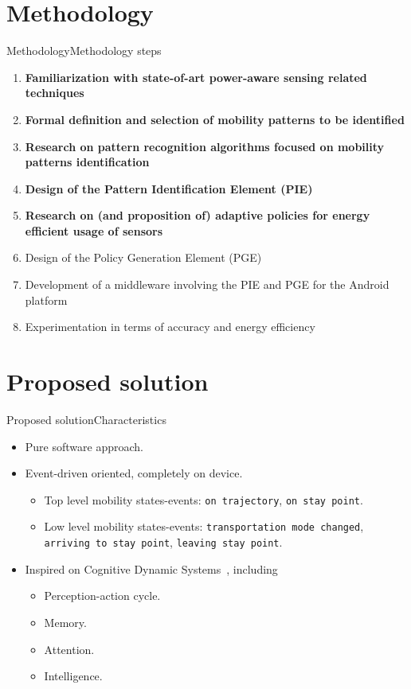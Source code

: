 \documentclass[10pt,xcolor={dvipsnames}]{beamer}
\begin{document}
\section{Methodology}
\begin{frame}{Methodology}{Methodology steps}
\begin{enumerate}
  \item \textbf{Familiarization with state-of-art power-aware sensing related techniques}
  \item \textbf{Formal definition and selection of mobility patterns to be identified}
  \item \textbf{Research on pattern recognition algorithms focused on mobility patterns identification}
  \item \textbf{Design of the Pattern Identification Element (PIE)}
  \item \textbf{Research on (and proposition of) adaptive policies for energy efficient usage of sensors}
  \item Design of the Policy Generation Element (PGE)
  \item Development of a middleware involving the PIE and PGE for the Android platform
  \item Experimentation in terms of accuracy and energy efficiency
\end{enumerate}
\end{frame}

\section{Proposed solution}
\begin{frame}{Proposed solution}{Characteristics}
\begin{itemize}
  \item Pure software approach.
  \pause
  \item Event-driven oriented, completely on device.
  \begin{itemize}
    \item Top level mobility states-events: \texttt{on trajectory}, \texttt{on stay point}.
    \pause
    \item Low level mobility states-events: \texttt{transportation mode changed}, \texttt{arriving to stay point}, \texttt{leaving stay point}.
    \pause
  \end{itemize}
  \item Inspired on Cognitive Dynamic Systems~\cite{Haykin2006}, including 
  \begin{itemize}
    \item Perception-action cycle.
    \pause
    \item Memory.
    \pause
    \item Attention.
    \pause
    \item Intelligence.
  \end{itemize}
\end{itemize}
\end{frame}
\end{document}
